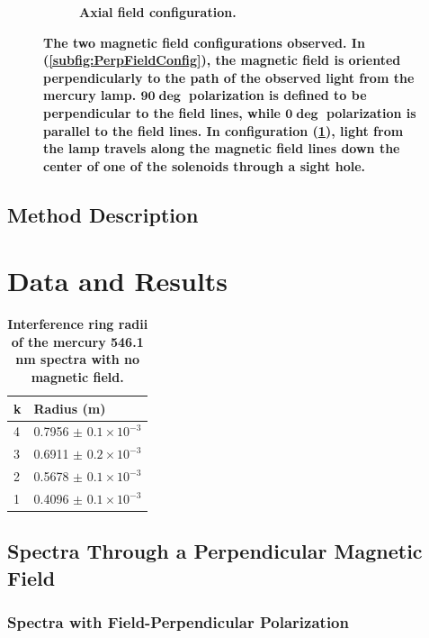 \documentclass[twocolumn]{article}
\begin{document}
\begin{figure}
\begin{subfigure}{0.55\textwidth}
			\caption{\textbf{Axial field configuration.}}
			\label{subfig:AxialFieldConfig}
		\end{subfigure}%
		\caption{\textbf{The two magnetic field configurations observed. In (\ref{subfig:PerpFieldConfig}), the magnetic field is oriented perpendicularly to the path of the observed light from the mercury lamp. $\mathbf{90\deg}$ polarization is defined to be perpendicular to the field lines, while $\mathbf{0\deg}$ polarization is parallel to the field lines. In configuration (\ref{subfig:AxialFieldConfig}), light from the lamp travels along the magnetic field lines down the center of one of the solenoids through a sight hole.}}
		\label{fig:FieldConfig}
	\end{figure}
	
	\subsection{Method Description} \label{subsec:MethodDescription}
	
\section{Data and Results} \label{sec:DataAndResults}
	 
	 \begin{table}[h]
	 	\centering
	 	\begin{tabular}{l|l}
	 		k & Radius (m) \\ \hline
	 		4 & 0.7956 $\pm$ $0.1\times10^{-3}$    \\
	 		3 & 0.6911 $\pm$ $0.2\times10^{-3}$    \\
	 		2 & 0.5678 $\pm$ $0.1\times10^{-3}$    \\
	 		1 & 0.4096 $\pm$ $0.1\times10^{-3}$   
	 	\end{tabular}
	 	\caption{\textbf{Interference ring radii of the mercury 546.1 nm spectra with no magnetic field.}}
	 	\label{tab:B0Data}
	 	
	 \end{table}
	\subsection{Spectra Through a Perpendicular Magnetic Field}
		\subsubsection{Spectra with Field-Perpendicular Polarization}
			
\end{document}
